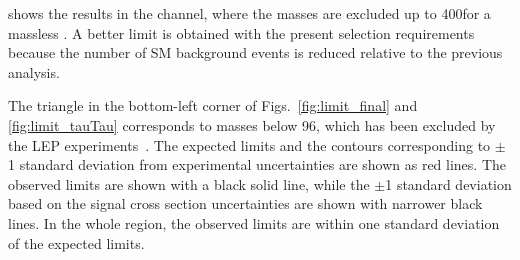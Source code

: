 shows the results in the \tauTau channel, where the \chione masses are excluded up to 400\GeV for a massless \PSGczDo. 
A better limit is obtained with the present selection requirements because the number of SM background events is reduced relative to the previous analysis.

The triangle in the bottom-left corner of Figs.~\ref{fig:limit_final} and 
\ref{fig:limit_tauTau} corresponds to  \sTau masses below 96\GeV, which has been excluded by the LEP experiments~\cite{lepsusy}.
The expected limits and the contours corresponding to $\pm$1 standard deviation from experimental uncertainties are shown as red lines. 
The observed limits are shown with a black solid line, 
while the $\pm$1 standard deviation based on the signal cross section uncertainties are shown with narrower black lines.
In the whole region, the observed limits are within one standard deviation of the expected limits.  


